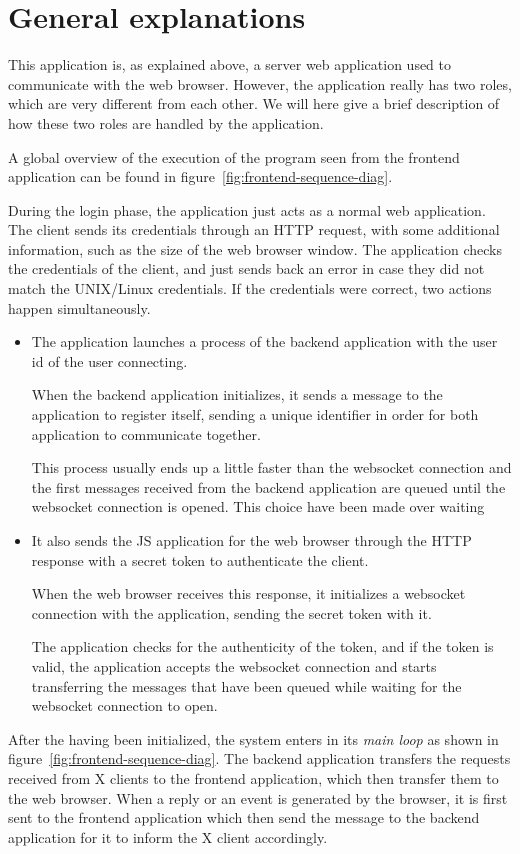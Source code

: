 \section{General explanations}
% 
This application is, as explained above, a server web application used to 
communicate with the web browser. However, the application really has two 
roles, which are very different from each other. We will here give a brief 
description of how these two roles are handled by the application.

A global overview of the execution of the program seen from the frontend 
application can be found in figure~\ref{fig:frontend-sequence-diag}.


During the login phase, the application just acts as a normal web 
application. The client sends its credentials through an HTTP request,
with some additional information, such as the size of the web browser 
window. The application checks the credentials of the client, and 
just sends back an error in case they did not match the UNIX/Linux 
credentials. If the credentials were correct, two actions happen 
simultaneously. 
\begin{itemize}
\item The application launches a process of the backend 
  application with the user id of the user connecting.
  
  When the backend application initializes, it sends a message to 
  the application to register itself, sending a unique identifier 
  in order for both application to communicate together. 

  This process usually ends up a little faster than the websocket connection and 
  the first messages received from the backend application are queued until 
  the websocket connection is opened. This choice have been made over waiting 
\item It also sends the JS application for the web browser through the HTTP 
  response with a secret token to authenticate the client. 
  
  When the web browser receives this response, it initializes a websocket 
  connection with the application, sending the secret token with it. 

  The application checks for the authenticity of the token, and if the token is valid, 
  the application accepts the websocket connection and starts transferring the messages 
  that have been queued while waiting for the websocket connection to open.
\end{itemize}

After the having been initialized, the system enters in its \emph{main loop} as shown 
in figure~\ref{fig:frontend-sequence-diag}. The backend application transfers the 
requests received from X clients to the frontend application, which then transfer 
them to the web browser. When a reply or an event is generated by the browser, 
it is first sent to the frontend application which then send the message to the backend 
application for it to inform the X client accordingly.
